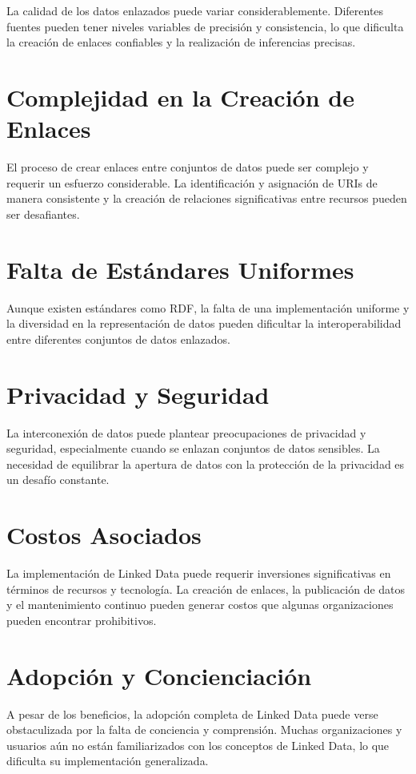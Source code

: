 \documentclass[11pt]{report}
\begin{document}
		La calidad de los datos enlazados puede variar considerablemente. Diferentes fuentes pueden tener niveles variables de precisión y consistencia, lo que dificulta la creación de enlaces confiables y la realización de inferencias precisas.
\section{Complejidad en la Creación de Enlaces}

		El proceso de crear enlaces entre conjuntos de datos puede ser complejo y requerir un esfuerzo considerable. La identificación y asignación de URIs de manera consistente y la creación de relaciones significativas entre recursos pueden ser desafiantes.
\section{Falta de Estándares Uniformes}

		Aunque existen estándares como RDF, la falta de una implementación uniforme y la diversidad en la representación de datos pueden dificultar la interoperabilidad entre diferentes conjuntos de datos enlazados.
\section{Privacidad y Seguridad}

		La interconexión de datos puede plantear preocupaciones de privacidad y seguridad, especialmente cuando se enlazan conjuntos de datos sensibles. La necesidad de equilibrar la apertura de datos con la protección de la privacidad es un desafío constante.
\section{Costos Asociados}

		La implementación de Linked Data puede requerir inversiones significativas en términos de recursos y tecnología. La creación de enlaces, la publicación de datos y el mantenimiento continuo pueden generar costos que algunas organizaciones pueden encontrar prohibitivos.
\section{Adopción y Concienciación}

		A pesar de los beneficios, la adopción completa de Linked Data puede verse obstaculizada por la falta de conciencia y comprensión. Muchas organizaciones y usuarios aún no están familiarizados con los conceptos de Linked Data, lo que dificulta su implementación generalizada.
\end{document}
